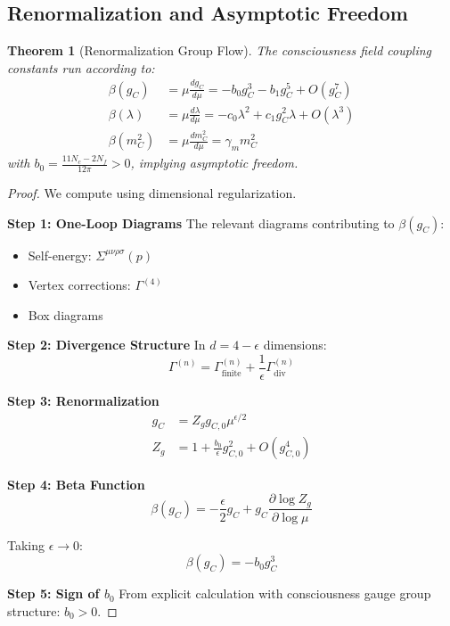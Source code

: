 \documentclass[11pt]{article}
\newtheorem{theorem}{Theorem}[section]
\theoremstyle{definition}
\begin{document}
\subsection{Renormalization and Asymptotic Freedom}

\begin{theorem}[Renormalization Group Flow]
\label{thm:rg_flow}
The consciousness field coupling constants run according to:
\begin{align}
\beta(g_C) &= \mu \frac{dg_C}{d\mu} = -b_0 g_C^3 - b_1 g_C^5 + O(g_C^7)\\
\beta(\lambda) &= \mu \frac{d\lambda}{d\mu} = -c_0 \lambda^2 + c_1 g_C^2 \lambda + O(\lambda^3)\\
\beta(m_C^2) &= \mu \frac{dm_C^2}{d\mu} = \gamma_m m_C^2
\end{align}
with $b_0 = \frac{11N_c - 2N_f}{12\pi} > 0$, implying asymptotic freedom.
\end{theorem}

\begin{proof}
We compute using dimensional regularization.

\textbf{Step 1: One-Loop Diagrams}
The relevant diagrams contributing to $\beta(g_C)$:
\begin{itemize}
\item Self-energy: $\Sigma^{\mu\nu\rho\sigma}(p)$
\item Vertex corrections: $\Gamma^{(4)}$
\item Box diagrams
\end{itemize}

\textbf{Step 2: Divergence Structure}
In $d = 4 - \epsilon$ dimensions:
\begin{equation}
\Gamma^{(n)} = \Gamma^{(n)}_{\text{finite}} + \frac{1}{\epsilon}\Gamma^{(n)}_{\text{div}}
\end{equation}

\textbf{Step 3: Renormalization}
\begin{align}
g_C &= Z_g g_{C,0} \mu^{\epsilon/2}\\
Z_g &= 1 + \frac{b_0}{\epsilon}g_{C,0}^2 + O(g_{C,0}^4)
\end{align}

\textbf{Step 4: Beta Function}
\begin{equation}
\beta(g_C) = -\frac{\epsilon}{2}g_C + g_C \frac{\partial \log Z_g}{\partial \log \mu}
\end{equation}

Taking $\epsilon \to 0$:
\begin{equation}
\beta(g_C) = -b_0 g_C^3
\end{equation}

\textbf{Step 5: Sign of $b_0$}
From explicit calculation with consciousness gauge group structure: $b_0 > 0$.
\end{proof}
\end{document}
